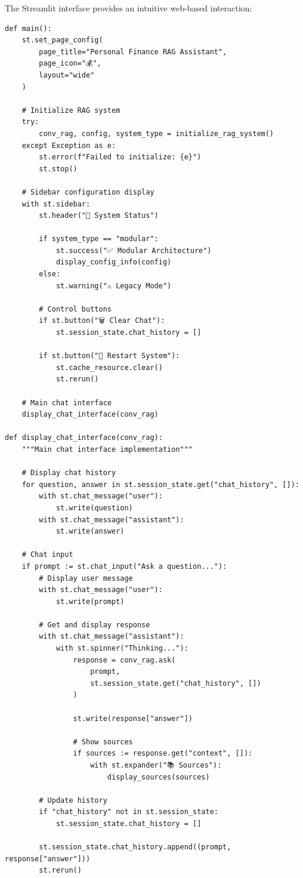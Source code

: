 \documentclass[12pt,a4paper]{article}
\begin{document}
The Streamlit interface provides an intuitive web-based interaction:

\begin{lstlisting}[caption=Streamlit Application Structure]
def main():
    st.set_page_config(
        page_title="Personal Finance RAG Assistant",
        page_icon="💰",
        layout="wide"
    )
    
    # Initialize RAG system
    try:
        conv_rag, config, system_type = initialize_rag_system()
    except Exception as e:
        st.error(f"Failed to initialize: {e}")
        st.stop()
    
    # Sidebar configuration display
    with st.sidebar:
        st.header("🔧 System Status")
        
        if system_type == "modular":
            st.success("✅ Modular Architecture")
            display_config_info(config)
        else:
            st.warning("⚠️ Legacy Mode")
        
        # Control buttons
        if st.button("🗑️ Clear Chat"):
            st.session_state.chat_history = []
        
        if st.button("🔄 Restart System"):
            st.cache_resource.clear()
            st.rerun()
    
    # Main chat interface
    display_chat_interface(conv_rag)

def display_chat_interface(conv_rag):
    """Main chat interface implementation"""
    
    # Display chat history
    for question, answer in st.session_state.get("chat_history", []):
        with st.chat_message("user"):
            st.write(question)
        with st.chat_message("assistant"):
            st.write(answer)
    
    # Chat input
    if prompt := st.chat_input("Ask a question..."):
        # Display user message
        with st.chat_message("user"):
            st.write(prompt)
        
        # Get and display response
        with st.chat_message("assistant"):
            with st.spinner("Thinking..."):
                response = conv_rag.ask(
                    prompt, 
                    st.session_state.get("chat_history", [])
                )
                
                st.write(response["answer"])
                
                # Show sources
                if sources := response.get("context", []):
                    with st.expander("📚 Sources"):
                        display_sources(sources)
        
        # Update history
        if "chat_history" not in st.session_state:
            st.session_state.chat_history = []
        
        st.session_state.chat_history.append((prompt, response["answer"]))
        st.rerun()
\end{lstlisting}
\end{document}

